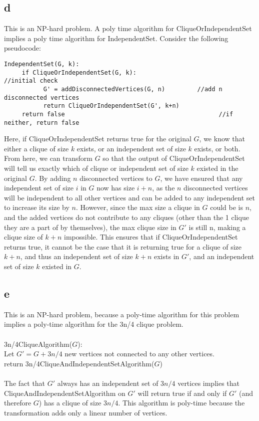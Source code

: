 \documentclass[letterpaper,notitlepage,twoside]{article}
\newcommand\tab[1][1cm]{\hspace*{#1}} %
\begin{document}
\subsection*{d}
This is an NP-hard problem. A poly time algorithm for CliqueOrIndependentSet implies a poly time algorithm for IndependentSet. Consider the following pseudocode:
\begin{verbatim}
IndependentSet(G, k):
     if CliqueOrIndependentSet(G, k):                            //initial check
           G' = addDisconnectedVertices(G, n)         //add n disconnected vertices
           return CliqueOrIndependentSet(G', k+n)
     return false                                           //if neither, return false
\end{verbatim}
Here, if CliqueOrIndependentSet returns true for the original $G$, we know that either a clique of size $k$ exists, or an independent set of size $k$ exists, or both. From here, we can transform $G$ so that the output of CliqueOrIndependentSet will tell us exactly which of clique or independent set of size $k$ existed in the original $G$. By adding $n$ disconnected vertices to $G$, we have ensured that any independent set of size $i$ in $G$ now has size $i + n$, as the $n$ disconnected vertices will be independent to all other vertices and can be added to any independent set to increase its size by $n$. However, since the max size a clique in $G$ could be is $n$, and the added vertices do not contribute to any cliques (other than the 1 clique they are a part of by themselves), the max clique size in $G'$ is still n, making a clique size of $k+n$ impossible. This ensures that if CliqueOrIndependentSet returns true, it cannot be the case that it is returning true for a clique of size $k+n$, and thus an independent set of size $k+n$ exists in $G'$, and an independent set of size $k$ existed in $G$. 
\subsection*{e}
This is an NP-hard problem, because a poly-time algorithm for this problem implies a poly-time algorithm for the 3n/4 clique problem.
\\\\
3n/4CliqueAlgorithm($G$):\\
\tab Let $G' = G + 3n/4$ new vertices not connected to any other vertices.\\
\tab return 3n/4CliqueAndIndependentSetAlgorithm($G$)
\\\\
The fact that $G'$ always has an independent set of $3n/4$ vertices implies that CliqueAndIndependentSetAlgorithm on $G'$ will return true if and only if $G'$ (and therefore $G$) has a clique of size $3n/4$. This algorithm is poly-time because the transformation adds only a linear number of vertices.
\end{document}
